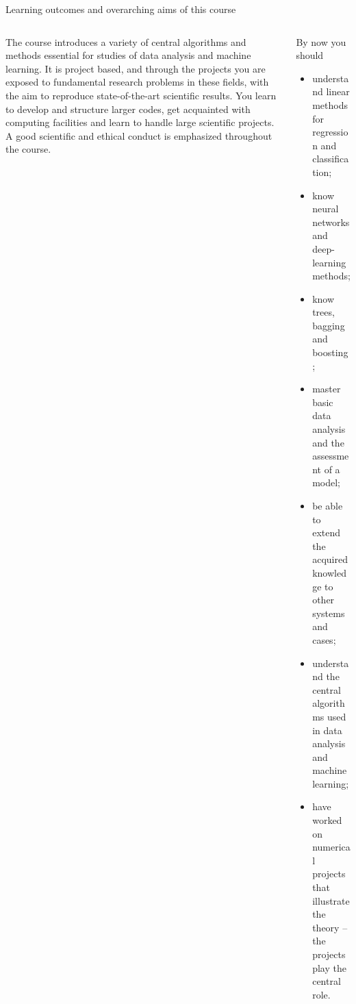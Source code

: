 \documentclass[10pt,aspectratio=169]{beamer}
\begin{document}
\begin{frame}{Learning outcomes and overarching aims of this course}
\begin{columns}[T]
\begin{column}{0.54\textwidth}
\small
The course introduces a variety of central algorithms and methods essential
for studies of data analysis and machine learning.  It is project based, and
through the projects you are exposed to fundamental research problems in
these fields, with the aim to reproduce state-of-the-art scientific
results.  You learn to develop and structure larger codes, get acquainted
with computing facilities and learn to handle large scientific projects.  A
good scientific and ethical conduct is emphasized throughout the course.
\end{column}
\begin{column}{0.44\textwidth}
\small
\begin{block}{By now you should}
\footnotesize
\begin{itemize}
  \item understand linear methods for regression and classification;
  \item know neural networks and deep-learning methods;
  \item know trees, bagging and boosting;
  \item master basic data analysis and the assessment of a model;
  \item be able to extend the acquired knowledge to other systems and
    cases;
  \item understand the central algorithms used in data analysis and
    machine learning;
  \item have worked on numerical projects that illustrate the theory -- the
    projects play the central role.
\end{itemize}
\end{block}
\end{column}
\end{columns}
\end{frame}
\end{document}
